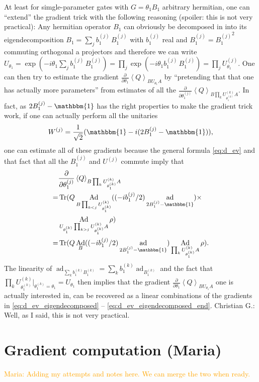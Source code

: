 \documentclass[aps,pra,10pt,twocolumn,groupedaddress,nofootinbib]{revtex4-1}
\theoremstyle{plain}
\DeclareMathOperator{\tr}{Tr}
\DeclareMathOperator{\Ad}{Ad}
\DeclareMathOperator{\ad}{ad}
\newcommand{\pd}[2]{\frac{\partial #1}{\partial #2}}  %
\newcommand{\I}{\mathbbm{1}} %
\newcommand{\expect}[1]{\ensuremath{\left\langle #1 \right\rangle}} %
\newcommand{\maria}[1]{\textcolor{orange}{Maria: #1}}
\newcommand{\cg}[1]{\textcolor{cyan!80!black}{Christian G.: #1}}
\begin{document}
At least for simgle-parameter gates with $G = \theta_1 B_1$ arbitrary hermitian, one can ``extend'' the gradient trick with the following reasoning (spoiler: this is not very practical):
Any hermitian operator $B_1$ can obviously be decomposed in into its eigendecomposition $B_1 = \sum_j b_1^{(j)} \, B_1^{(j)}$ with $b_1^{(j)}$ real and $B_1^{(j)} = {B_1^{(j)}}^2$ commuting orthogonal a projectors and therefore we can write $U_{\theta_1} = \exp(-i \theta_1 \sum_j b_1^{(j)} \, B_1^{(j)}) = \prod_j \exp(-i \theta_1 b_1^{(j)} \, B_1^{(j)}) = \prod_j U^{(j)}_{\theta_1}$.
One can then try to estimate the gradient $\pd{}{\theta_1} \expect{Q}_{B U_{\theta_1} A}$ by ``pretending that that one has actually more parameters'' from estimates of all the $\pd{}{\theta_1^{(j)}} \expect{Q}_{B \prod_k U^{(k)}_{\theta_1^{(k)}} A}$.
In fact, as $2 B_1^{(j)} - \I$ has the right properties to make the gradient trick work, if one can actually perform all the unitaries
\begin{equation}
  W^{(j)} = \frac{1}{\sqrt{2}}(\I - i (2 B_1^{(j)} - \I)) ,
\end{equation}
one can estimate all of these gradients because the general formula \eqref{eq:d_ev} and that fact that all the $B_1^{(j)}$ and $U^{(j)}$ commute imply that
\begin{align}
    \label{eq:d_ev_eigendecomposed}
  &\pd{}{\theta_1^{(j)}} \expect{Q}_{B \prod_k U^{(k)}_{\theta_1^{(k)}}  A} \\
  = &\tr(Q \Ad_{B \prod_{k<j} U^{(k)}_{\theta_1^{(k)}}} ((-i b_1^{(j)}/2) \ad_{2 B_1^{(j)} - \I}) \times\\ &\Ad_{U_{\theta_1^{(k)}} \prod_{k>j} U^{(k)}_{\theta_1^{(k)}} A} \rho)\\
  = &\tr(Q \Ad_B ((-i b_1^{(j)}/2) \ad_{2 B_1^{(j)} - \I}) \Ad_{\prod_{k} U^{(k)}_{\theta_1^{(k)}} A} \rho).     \label{eq:d_ev_eigendecomposed_end}
\end{align}
The linearity of $\ad_{\sum_k b_1^{(k)} B_1^{(k)}} = \sum_k b_1^{(k)} \ad_{B_1^{(k)}}$ and the fact that $\prod_{k} U^{(k)}_{\theta_1^{(k)}} \big|_{\theta_1^{(k)} = \theta_1} = U_{\theta_1}$ then implies that the gradient $\pd{}{\theta_1} \expect{Q}_{B U_{\theta_1} A}$ one is actually interested in, can be recovered as a linear combinations of the gradients in \eqref{eq:d_ev_eigendecomposed} -- \eqref{eq:d_ev_eigendecomposed_end}.
\cg{Well, as I said, this is not very practical.}

\section{Gradient computation (Maria)}
\maria{Adding my attempts and notes here. We can merge the two when ready.}
\end{document}
